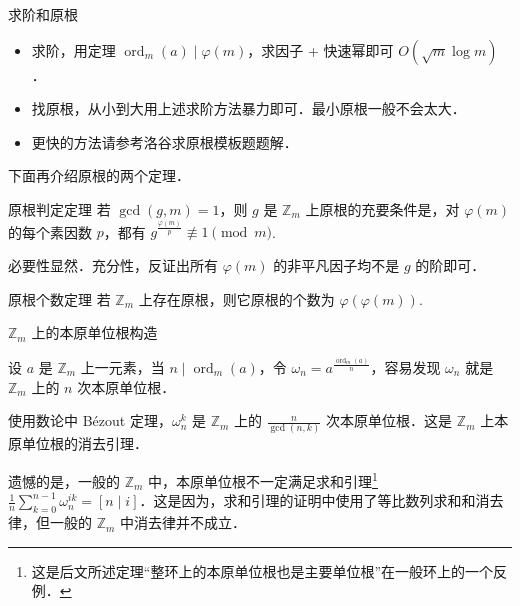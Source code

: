 \documentclass[fontset=fandol]{ctexbeamer}
\DeclareMathOperator{\ord}{ord}
\begin{document}
\begin{frame}{求阶和原根}

\begin{itemize}
    \item 求阶，用定理 $\ord_m(a) \mid \varphi(m)$，求因子 + 快速幂即可 $O(\sqrt m \log m)$．
    \item 找原根，从小到大用上述求阶方法暴力即可．最小原根一般不会太大．
    \item 更快的方法请参考洛谷求原根模板题题解．
\end{itemize}

下面再介绍原根的两个定理．

\begin{block}{原根判定定理}
    若 $\gcd(g,m)=1$，则 $g$ 是 $\mathbb Z_m$ 上原根的充要条件是，对 $\varphi(m)$ 的每个素因数 $p$，都有 $g^{\frac{\varphi(m)}{p}}\not\equiv 1\pmod m$.
\end{block}

必要性显然．充分性，反证出所有 $\varphi(m)$ 的非平凡因子均不是 $g$ 的阶即可．

\begin{block}{原根个数定理}
    若 $\mathbb Z_m$ 上存在原根，则它原根的个数为 $\varphi(\varphi(m))$.
\end{block}

\end{frame}
\begin{frame}{$\mathbb Z_m$ 上的本原单位根构造}
    
    设 $a$ 是 $\mathbb Z_m$ 上一元素，当 $n \mid \ord_m(a)$，令 $\omega_n = a^{\frac{\ord_m(a)}{n}}$，容易发现 $\omega_n$ 就是 $\mathbb Z_m$ 上的 $n$ 次本原单位根．

    使用数论中 B{\'e}zout 定理，\alert{$\omega_n^k$ 是 $\mathbb Z_m$ 上的 $\frac n {\gcd(n,k)}$ 次本原单位根}．这是 $\mathbb Z_m$ 上本原单位根的\alert{消去引理}．

    遗憾的是，\alert{一般的 $\mathbb Z_m$ 中，本原单位根不一定满足求和引理}\footnote{这是后文所述定理“整环上的本原单位根也是主要单位根”在一般环上的一个反例．} $\frac 1 n \sum_{k=0}^{n-1} \omega_{n}^{ik} = [n \mid i]$．这是因为，求和引理的证明中使用了等比数列求和和消去律，但\alert{一般的 $\mathbb Z_m$ 中消去律并不成立}．
\end{frame}
\end{document}
